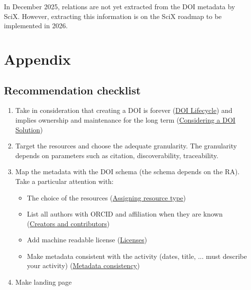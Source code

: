 \documentclass[11pt,a4paper]{ivoa}
\begin{document}
In December 2025, relations are not yet extracted from the DOI metadata by SciX. However, extracting this information is on the SciX roadmap to be implemented in 2026.

\section{Appendix}\hypertarget{appendix}{}\label{sec:appendix}

\subsection{Recommendation checklist}\hypertarget{recommendation-checklist}{}\label{sec:recommendation-checklist}

\begin{enumerate}
\item{} Take in consideration that creating a DOI is forever (\hyperlink{doi-lifecycle}{DOI Lifecycle}) and implies ownership and maintenance for the long term (\hyperlink{considering-a-doi-solution}{Considering a DOI Solution})
\item{} Target the resources and choose the adequate granularity. The granularity depends on parameters such as citation, discoverability, traceability.
\item{} Map the metadata  with the DOI schema (the schema depends on the RA).
Take a particular attention with:


\begin{itemize}
\item{} The choice of the resources (\hyperlink{assigning-resource-type}{Assigning resource type})
\item{} List all authors with ORCID and affiliation when they are known (\hyperlink{creators-and-contributors}{Creators and contributors})
\item{} Add machine readable license (\hyperlink{licenses}{Licenses})
\item{} Make metadata consistent with the activity (dates,  title, ...  must describe your activity) (\hyperlink{metadata-consistency}{Metadata consistency})
\end{itemize}
\item{} Make landing page



\end{enumerate}
\end{document}
